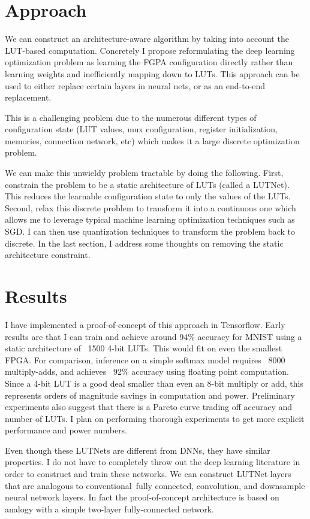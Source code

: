 \documentclass{article}
\begin{document}
\section{Approach}
We can construct an architecture-aware algorithm by taking into account the LUT-based computation. Concretely I propose reformulating the deep learning optimization problem as learning the FGPA configuration directly rather than learning weights and inefficiently mapping down to LUTs. This approach can be used to either replace certain layers in neural nets, or as an end-to-end replacement. 

This is a challenging problem due to the numerous different types of configuration state (LUT values, mux configuration, register initialization, memories, connection network, etc) which makes it a large discrete optimization problem.

We can make this unwieldy problem tractable by doing the following. First, constrain the problem to be a static architecture of LUTs (called a LUTNet). This reduces the learnable configuration state to only the values of the LUTs. Second, relax this discrete problem to transform it into a continuous one which allows me to leverage typical machine learning optimization techniques such as SGD. I can then use quantization techniques to transform the problem back to discrete. In the last section, I address some thoughts on removing the static architecture constraint.

\section{Results}
I have implemented a proof-of-concept of this approach in Tensorflow. Early results are that I can train and achieve around 94\% accuracy for MNIST using a static architecture of ~1500 4-bit LUTs. This would fit on even the smallest FPGA. For comparison, inference on a simple softmax model requires ~8000 multiply-adds, and achieves ~92\% accuracy using floating point computation. Since a 4-bit LUT is a good deal smaller than even an 8-bit multiply or add, this represents orders of magnitude savings in computation and power. Preliminary experiments also suggest that there is a Pareto curve trading off accuracy and number of LUTs. I plan on performing thorough experiments to get more explicit performance and power numbers.

Even though these LUTNets are different from DNNs, they have similar properties. I do not have to completely throw out the deep learning literature in order to construct and train these networks. We can construct LUTNet layers that are analogous to conventional fully connected, convolution, and downsample neural network layers. In fact the proof-of-concept architecture is based on analogy with a simple two-layer fully-connected network.
\end{document}
